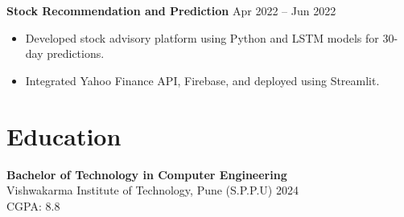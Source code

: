 \documentclass[a4paper,10pt]{article}
\begin{document}
\textbf{Stock Recommendation and Prediction} \hfill Apr 2022 -- Jun 2022
\begin{itemize}[leftmargin=*]
    \item Developed stock advisory platform using Python and LSTM models for 30-day predictions.
    \item Integrated Yahoo Finance API, Firebase, and deployed using Streamlit.
\end{itemize}

\section*{Education}

\textbf{Bachelor of Technology in Computer Engineering} \\
Vishwakarma Institute of Technology, Pune (S.P.P.U) \hfill 2024 \\
CGPA: 8.8
\end{document}
